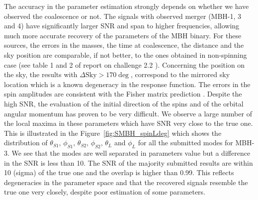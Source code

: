 \documentclass{iopart}
\begin{document}
The accuracy in the parameter estimation strongly depends on whether we have observed the coalescence or not.
The signals with observed merger (MBH-1, 3 and 4) have significantly larger SNR and span to higher frequencies, 
allowing much more accurate recovery of the parameters of the MBH binary. 
 For these sources, the errors in the masses, the time at coalescence, the distance and the sky position are comparable, if not better, to the ones obtained in non-spinning case (see table 1 and 2 of report on challenge 2.2 \cite{MLDC2Res}). Concerning the position on the sky, the results with  $\Delta \textrm{Sky} > 170 \deg$, correspond to the mirrored sky location which is a known degeneracy in the response function. The errors in the spin amplitudes
  are consistent with the Fisher matrix prediction \cite{SpinBBHLangHugues}.  Despite the high SNR, the evaluation of the initial direction of the spins and of the orbital angular momentum has proven to be very difficult.  We observe a large number of the local maxima in these parameters which have SNR very close to the true one. This is illustrated in the Figure~\ref{fig:SMBH_spinLdeg} which shows the distribution of $\theta_{S1}$, $\phi_{S1}$, $\theta_{S2}$, $\phi_{S2}$, $\theta_{L}$ and $\phi_{L}$ for all the submitted modes for MBH-3. We see that the modes are well separated in parameters value but a difference in the SNR is less than 10. The SNR of the majority submitted results are within 10 (sigma) of the true one and the overlap is higher than 0.99.
This reflects degeneracies in the parameter space and that the recovered signals resemble the true one very closely, despite poor estimation of some parameters.
\end{document}
